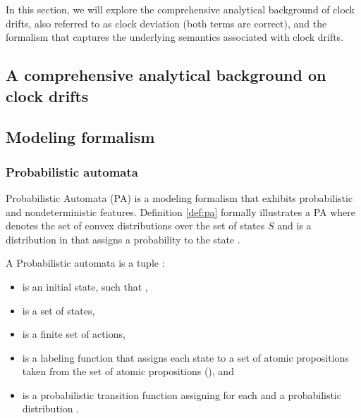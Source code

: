 In this section, we will explore the comprehensive analytical background of clock drifts, also referred to as clock deviation (both terms are correct), and the formalism that captures the underlying semantics associated with clock drifts.
\subsection{A comprehensive analytical background on clock drifts}


\subsection{Modeling formalism}
\subsubsection{Probabilistic automata}
\label{sec:pa}


Probabilistic Automata (PA) \cite{ref27} is a modeling formalism that exhibits probabilistic and nondeterministic features. Definition \ref{def:pa} formally illustrates a PA where  denotes the set of convex distributions over the set of states $S$ and \emath{\mu} is a distribution in  that assigns a probability  to the state .

\begin{mydef} \label{def:pa} \normalfont  A Probabilistic automata is a tuple :
\label{ts}
\begin{itemize}
	\item {} is an initial state, such that ,
 
	\item {} is a set of states,

	\item \emath{\Sigma}  is a finite set of actions,

 	\item {} is a labeling function that assigns each state   to a set of atomic propositions taken from the set of atomic propositions (), and

    \item {} is a probabilistic transition function assigning for each  and \emath{\alpha \in \Sigma } a probabilistic distribution . 
\end{itemize}
\end{mydef}


